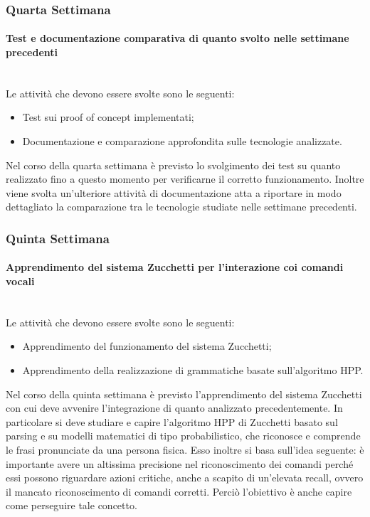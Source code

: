 {    \subsubsection{Quarta Settimana}
    	\paragraph*{Test e documentazione comparativa di quanto svolto nelle settimane precedenti} \mbox{}\\ [1mm]
    	Le attività che devono essere svolte sono le seguenti:
        \begin{itemize}
            \item Test sui proof of concept implementati;
            \item Documentazione e comparazione approfondita sulle tecnologie analizzate.
        \end{itemize}
    	Nel corso della quarta settimana è previsto lo svolgimento dei test su quanto realizzato fino a questo momento per verificarne il corretto funzionamento. Inoltre viene svolta un'ulteriore attività di documentazione atta a riportare in modo dettagliato la comparazione tra le tecnologie studiate nelle settimane precedenti.
    \subsubsection{Quinta Settimana}
    	\paragraph*{Apprendimento del sistema Zucchetti per l'interazione coi comandi vocali} \mbox{}\\ [1mm]
    	Le attività che devono essere svolte sono le seguenti:
        \begin{itemize}
            \item Apprendimento del funzionamento del sistema Zucchetti;
            \item Apprendimento della realizzazione di grammatiche basate sull'algoritmo HPP.
        \end{itemize}
    	Nel corso della quinta settimana è previsto l'apprendimento del sistema Zucchetti con cui deve avvenire l'integrazione di quanto analizzato precedentemente. In particolare si deve studiare e capire l'algoritmo HPP di Zucchetti basato sul parsing e su modelli matematici di tipo probabilistico, che riconosce e comprende le frasi pronunciate da una persona fisica. Esso inoltre si basa sull'idea seguente: è importante avere un altissima precisione nel riconoscimento dei comandi perché essi possono riguardare azioni critiche, anche a scapito di un'elevata recall, ovvero il mancato riconoscimento di comandi corretti. Perciò l'obiettivo è anche capire come perseguire tale concetto.
}
